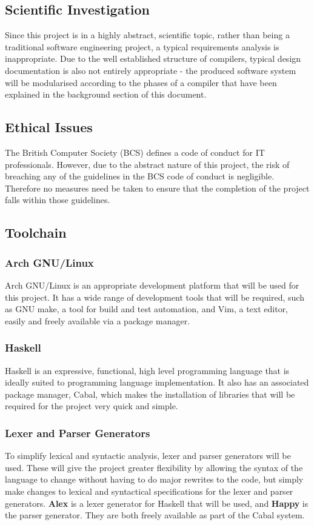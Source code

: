 \documentclass{article}
\begin{document}
\subsection{Scientific Investigation}
Since this project is in a highly abstract, scientific topic, rather than being a traditional software engineering project, a typical requirements analysis is inappropriate. Due to the well established structure of compilers, typical design documentation is also not entirely appropriate - the produced software system will be modularised according to the phases of a compiler that have been explained in the background section of this document.

\subsection{Ethical Issues} %
The British Computer Society (BCS) defines a code of conduct for IT professionals. However, due to the abstract nature of this project, the risk of breaching any of the guidelines in the BCS code of conduct is negligible. Therefore no measures need be taken to ensure that the completion of the project falls within those guidelines.

\subsection{Toolchain}
\subsubsection{Arch GNU/Linux}
Arch GNU/Linux is an appropriate development platform that will be used for this project. It has a wide range of development tools that will be required, such as GNU make, a tool for build and test automation, and Vim, a text editor, easily and freely available via a package manager.

\subsubsection{Haskell}
Haskell is an expressive, functional, high level programming language that is ideally suited to programming language implementation. It also has an associated package manager, Cabal, which makes the installation of libraries that will be required for the project very quick and simple.

\subsubsection{Lexer and Parser Generators}
To simplify lexical and syntactic analysis, lexer and parser generators will be used. These will give the project greater flexibility by allowing the syntax of the language to change without having to do major rewrites to the code, but simply make changes to lexical and syntactical specifications for the lexer and parser generators. \textbf{Alex} is a lexer generator for Haskell that will be used, and \textbf{Happy} is the parser generator. They are both freely available as part of the Cabal system.
\end{document}

